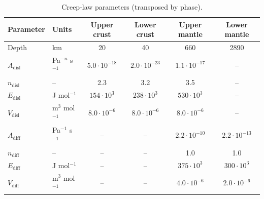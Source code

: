 \begin{table}[htbp]
\centering
\caption{Creep-law parameters (transposed by phase).}
\label{tab:convection-rheology-params}
\small
\begin{tabular}{llcccc}
\hline
Parameter & Units & Upper crust & Lower crust & Upper mantle & Lower mantle \\
\hline
Depth & km & 20 & 40 & 660 & 2890 \\
$A_{\mathrm{disl}}$ & Pa$^{-n}$ s$^{-1}$ & $5.0\cdot10^{-18}$ & $2.0\cdot10^{-23}$ & $1.1\cdot10^{-17}$ & -- \\
$n_{\mathrm{disl}}$ & -- & 2.3 & 3.2 & 3.5 & -- \\
$E_{\mathrm{disl}}$ & J mol$^{-1}$ & $154\cdot10^{3}$ & $238\cdot10^{3}$ & $530\cdot10^{3}$ & -- \\
$V_{\mathrm{disl}}$ & m$^3$ mol$^{-1}$ & $8.0\cdot10^{-6}$ & $8.0\cdot10^{-6}$ & $8.0\cdot10^{-6}$ & -- \\
$A_{\mathrm{diff}}$ & Pa$^{-1}$ s$^{-1}$ & -- & -- & $2.2\cdot10^{-10}$ & $2.2\cdot10^{-13}$ \\
$n_{\mathrm{diff}}$ & -- & -- & -- & 1.0 & 1.0 \\
$E_{\mathrm{diff}}$ & J mol$^{-1}$ & -- & -- & $375\cdot10^{3}$ & $300\cdot10^{3}$ \\
$V_{\mathrm{diff}}$ & m$^3$ mol$^{-1}$ & -- & -- & $4.0\cdot10^{-6}$ & $2.0\cdot10^{-6}$ \\
\hline
\end{tabular}
\end{table}
